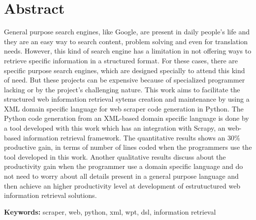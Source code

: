 \chapter*{Abstract}
\thispagestyle{fancy}
General purpose search engines, like Google, are present in daily people's life and they are an easy way to search content, problem solving and even for translation needs. However, this kind of search engine has a limitation in not offering ways to retrieve specific information in a structured format. For these cases, there are specific purpose search engines, which are designed specially to attend this kind of need. But these projects can be expensive because of specialized programmer lacking or by the project's challenging nature. This work aims to facilitate the structured web information retrieval sytems creation and maintenance by using a XML domain specific language for web scraper code generation in Python. The Python code generation from an XML-based domain specific language is done by a tool developed with this work which has an integration with Scrapy, an web-based information retrieval framework. The quantitative results shows an 30\% productive gain, in terms of number of lines coded when the programmers use the tool developed in this work. Another qualitative results discuss about the productivity gain when the programmer use a domain specific language and do not need to worry about all details present in a general purpose language and then achieve an higher productivity level at development of estrutuctured web information retrieval solutions.

	\textbf{Keywords:} scraper, web, python, xml, wpt, dsl, information retrieval
